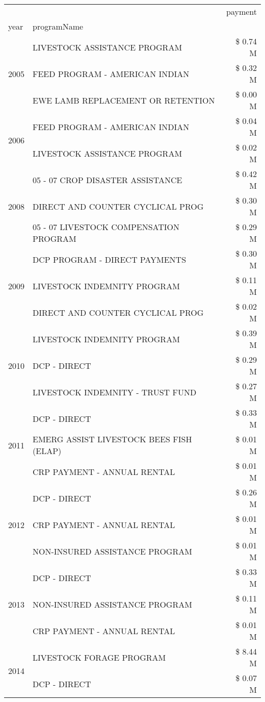\begin{tabular}{llr}
\toprule
 &  & payment \\
year & programName &  \\
\midrule
\multirow[t]{3}{*}{2005} & LIVESTOCK ASSISTANCE PROGRAM & \$ 0.74 M \\
 & FEED PROGRAM - AMERICAN INDIAN & \$ 0.32 M \\
 & EWE LAMB REPLACEMENT OR RETENTION & \$ 0.00 M \\
\cline{1-3}
\multirow[t]{2}{*}{2006} & FEED PROGRAM - AMERICAN INDIAN & \$ 0.04 M \\
 & LIVESTOCK ASSISTANCE PROGRAM & \$ 0.02 M \\
\cline{1-3}
\multirow[t]{3}{*}{2008} & 05 - 07 CROP DISASTER ASSISTANCE & \$ 0.42 M \\
 & DIRECT AND COUNTER CYCLICAL PROG & \$ 0.30 M \\
 & 05 - 07 LIVESTOCK COMPENSATION PROGRAM & \$ 0.29 M \\
\cline{1-3}
\multirow[t]{3}{*}{2009} & DCP PROGRAM - DIRECT PAYMENTS & \$ 0.30 M \\
 & LIVESTOCK INDEMNITY PROGRAM & \$ 0.11 M \\
 & DIRECT AND COUNTER CYCLICAL PROG & \$ 0.02 M \\
\cline{1-3}
\multirow[t]{3}{*}{2010} & LIVESTOCK INDEMNITY PROGRAM & \$ 0.39 M \\
 & DCP - DIRECT & \$ 0.29 M \\
 & LIVESTOCK INDEMNITY - TRUST FUND & \$ 0.27 M \\
\cline{1-3}
\multirow[t]{3}{*}{2011} & DCP - DIRECT & \$ 0.33 M \\
 & EMERG ASSIST LIVESTOCK BEES FISH (ELAP) & \$ 0.01 M \\
 & CRP PAYMENT - ANNUAL RENTAL & \$ 0.01 M \\
\cline{1-3}
\multirow[t]{3}{*}{2012} & DCP - DIRECT & \$ 0.26 M \\
 & CRP PAYMENT - ANNUAL RENTAL & \$ 0.01 M \\
 & NON-INSURED ASSISTANCE PROGRAM & \$ 0.01 M \\
\cline{1-3}
\multirow[t]{3}{*}{2013} & DCP - DIRECT & \$ 0.33 M \\
 & NON-INSURED ASSISTANCE PROGRAM & \$ 0.11 M \\
 & CRP PAYMENT - ANNUAL RENTAL & \$ 0.01 M \\
\cline{1-3}
\multirow[t]{3}{*}{2014} & LIVESTOCK FORAGE PROGRAM & \$ 8.44 M \\
 & DCP - DIRECT & \$ 0.07 M \\

\end{tabular}
